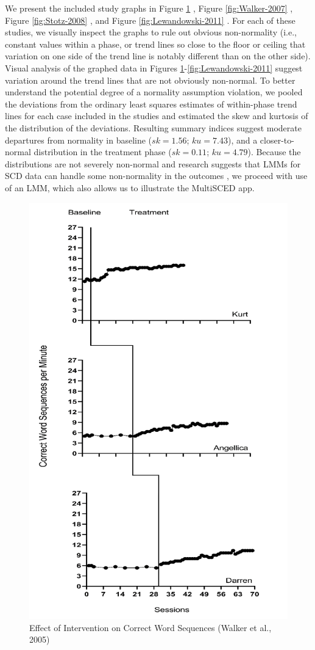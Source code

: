 \documentclass[
]{book}
\begin{document}
We present the included study graphs in Figure \ref{fig:Walker-2005} \citep{walker2005using}, Figure \ref{fig:Walker-2007} \citep{walker2007improving}, Figure \ref{fig:Stotz-2008} \citep{stotz2008Effects}, and Figure \ref{fig:Lewandowski-2011} \citep{lewandowski2011effects}. For each of these studies, we visually inspect the graphs to rule out obvious non-normality (i.e., constant values within a phase, or trend lines so close to the floor or ceiling that variation on one side of the trend line is notably different than on the other side). Visual analysis of the graphed data in Figures \ref{fig:Walker-2005}-\ref{fig:Lewandowski-2011} suggest variation around the trend lines that are not obviously non-normal. To better understand the potential degree of a normality assumption violation, we pooled the deviations from the ordinary least squares estimates of within-phase trend lines for each case included in the studies and estimated the skew and kurtosis of the distribution of the deviations. Resulting summary indices suggest moderate departures from normality in baseline (\(sk = 1.56\); \(ku = 7.43\)), and a closer-to-normal distribution in the treatment phase (\(sk = 0.11\); \(ku = 4.79\)). Because the distributions are not severely non-normal and research suggests that LMMs for SCD data can handle some non-normality in the outcomes \citep{Declercq2019, Joo_Ferron_2019}, we proceed with use of an LMM, which also allows us to illustrate the MultiSCED app.

\begin{figure}
\includegraphics[width=0.6\linewidth]{images/Walker2005} \caption{Effect of Intervention on Correct Word Sequences (Walker et al., 2005)}\label{fig:Walker-2005}
\end{figure}
\end{document}
